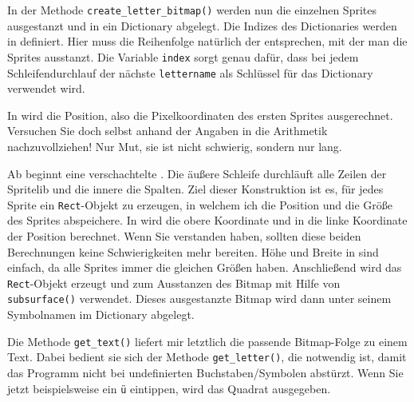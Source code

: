 
In der Methode \texttt{create\_letter\_bitmap()} werden nun die einzelnen Sprites ausgestanzt und in ein Dictionary abgelegt. Die Indizes des Dictionaries werden in  definiert. Hier muss die Reihenfolge natürlich der entsprechen, mit der man die Sprites ausstanzt. Die Variable \texttt{index} sorgt genau dafür, dass bei jedem Schleifendurchlauf der nächste \texttt{lettername} als Schlüssel für das Dictionary verwendet wird.

In  wird die Position, also die Pixelkoordinaten des ersten Sprites ausgerechnet. Versuchen Sie doch selbst anhand der Angaben in  die Arithmetik nachzuvollziehen! Nur Mut, sie ist nicht schwierig, sondern nur lang.

Ab  beginnt eine verschachtelte \forSchleife. Die äußere Schleife durchläuft alle Zeilen der Spritelib und die innere die Spalten. Ziel dieser Konstruktion ist es, für jedes Sprite ein \texttt{Rect}-Objekt zu erzeugen, in welchem ich die Position und die Größe des Sprites abspeichere. In  wird die obere Koordinate und in  die linke Koordinate der Position berechnet. Wenn Sie  verstanden haben, sollten diese beiden Berechnungen keine Schwierigkeiten mehr bereiten. Höhe und Breite in  sind einfach, da alle Sprites immer die gleichen Größen haben. Anschließend wird das \texttt{Rect}-Objekt erzeugt und zum Ausstanzen des Bitmap mit Hilfe von \texttt{subsurface()} verwendet. Dieses ausgestanzte Bitmap wird dann unter seinem Symbolnamen im Dictionary abgelegt.


Die Methode \texttt{get\_text()} liefert mir letztlich die passende Bitmap-Folge zu einem Text. Dabei bedient sie sich der Methode \texttt{get\_letter()}, die notwendig ist, damit das Programm nicht bei undefinierten Buchstaben/Symbolen abstürzt. Wenn Sie jetzt beispielsweise ein \texttt{ü} eintippen, wird das Quadrat ausgegeben.



